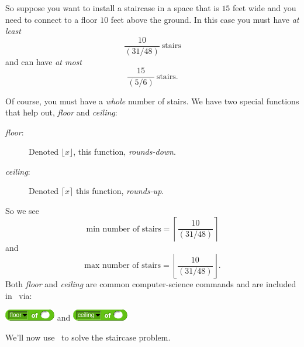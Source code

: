 \documentclass[noauthor,nooutcomes,12pt]{ximera}
\begin{document}
So suppose you want to install a staircase in a space that is $15$
feet wide and you need to connect to a floor $10$ feet above the
ground. In this case you must have \emph{at least}
\[
\frac{10}{\left(31/48\right)} \ \text{stairs}
\]
and can have \emph{at most}
\[
\frac{15}{\left(5/6\right)} \ \text{stairs}.
\]


Of course, you must have a \emph{whole} number of stairs. We have two special functions that help out, \emph{floor} and \emph{ceiling}:
\begin{description}
\item[\emph{floor}:] Denoted $\lfloor x\rfloor$, this function, \emph{rounds-down}.
\item[\emph{ceiling}:] Denoted $\lceil x\rceil$ this function, \emph{rounds-up}.
\end{description}
So we see
\[
\text{min number of stairs} = \left\lceil \frac{10}{\left(31/48\right)} \right\rceil
\]
and
\[
\text{max number of stairs} = \left\lfloor \frac{10}{\left(31/48\right)} \right\rfloor.
\]
Both \emph{floor} and \emph{ceiling} are common computer-science
commands and are included in \snap\ via:
\begin{center}
  \includegraphics{floor-script.png}
  \qquad
  and
  \qquad
\includegraphics{ceiling-script.png}
\end{center}
We'll now use \snap\ to solve the staircase problem.

\mynewpage
\end{document}
